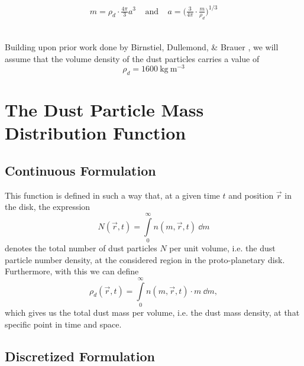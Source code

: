 
    \begin{align}
        m
            =\rho_d\cdot\frac{4\pi}{3}a^3
        \ \ \ \ \ \text{and}\ \ \ \ \
        a
            =\bigg(\frac{3}{4\pi}\cdot\frac{m}{\rho_d}\bigg)^{1/3}
    \end{align}

     \\

    Building upon prior work done by Birnstiel, Dullemond, \& Brauer %
    \cite{birnstiel_dullemond_brauer_2010}, we will assume that the volume density of the dust 
    particles carries a value of
    $$\rho_d=\SI{1600}{\kilogram\ \meter^{-3}}$$

\section{The Dust Particle Mass Distribution Function}

    \subsection{Continuous Formulation}

        This function is defined in such a way that, at a given time $t$ and position $\vec r$ 
        in the disk, the expression
        \begin{equation}
            N(\vec r, t)
                =\int\limits_0^\infty n(m,\vec r, t)\ \dd m
        \end{equation}
        denotes the total number of dust particles $N$ per unit volume, i.e. the dust particle
        number density, at the considered region in the proto-planetary disk. \\

        Furthermore, with this we can define 
        \begin{equation}
            \rho_d(\vec r, t)
                =\int\limits_0^\infty n(m,\vec r, t)\cdot m\ \dd m,
        \end{equation}
        which gives us the total dust mass per volume, i.e. the dust mass density, 
        at that specific point in time and space.

    \clearpage\subsection{Discretized Formulation}

